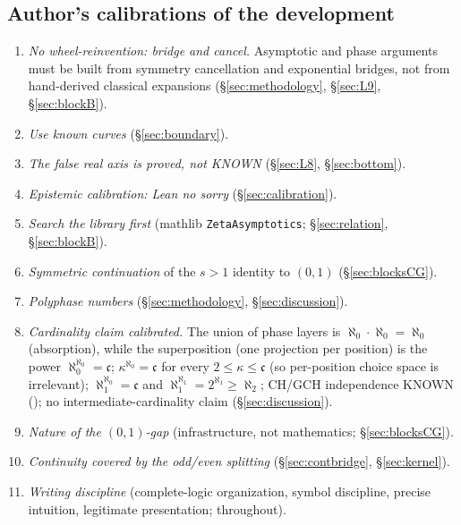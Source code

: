 \documentclass{article}
\begin{document}
\subsection*{Author's calibrations of the development}
\begin{enumerate}
\item \emph{No wheel-reinvention: bridge and cancel.} Asymptotic and phase
arguments must be built from symmetry cancellation and exponential bridges,
not from hand-derived classical expansions (\S\ref{sec:methodology},
\S\ref{sec:L9}, \S\ref{sec:blockB}).
\item \emph{Use known curves} (\S\ref{sec:boundary}).
\item \emph{The false real axis is proved, not KNOWN}
(\S\ref{sec:L8}, \S\ref{sec:bottom}).
\item \emph{Epistemic calibration: Lean no sorry}
(\S\ref{sec:calibration}).
\item \emph{Search the library first} (mathlib \texttt{ZetaAsymptotics};
\S\ref{sec:relation}, \S\ref{sec:blockB}).
\item \emph{Symmetric continuation} of the $s>1$ identity to $(0,1)$
(\S\ref{sec:blocksCG}).
\item \emph{Polyphase numbers} (\S\ref{sec:methodology},
\S\ref{sec:discussion}).
\item \emph{Cardinality claim calibrated.} The union of phase layers is
$\aleph_0\cdot\aleph_0=\aleph_0$ (absorption), while the superposition
(one projection per position) is the power
$\aleph_0^{\aleph_0}=\mathfrak c$; $\kappa^{\aleph_0}=\mathfrak c$ for
every $2\le\kappa\le\mathfrak c$ (so per-position choice space is
irrelevant); $\aleph_1^{\aleph_0}=\mathfrak c$ and
$\aleph_1^{\aleph_1}=2^{\aleph_1}\ge\aleph_2$; CH/GCH independence KNOWN
(\cite{cohen}); no intermediate-cardinality claim
(\S\ref{sec:discussion}).
\item \emph{Nature of the $(0,1)$-gap} (infrastructure, not mathematics;
\S\ref{sec:blocksCG}).
\item \emph{Continuity covered by the odd/even splitting}
(\S\ref{sec:contbridge}, \S\ref{sec:kernel}).
\item \emph{Writing discipline} (complete-logic organization, symbol
discipline, precise intuition, legitimate presentation; throughout).
\end{enumerate}
\end{document}
